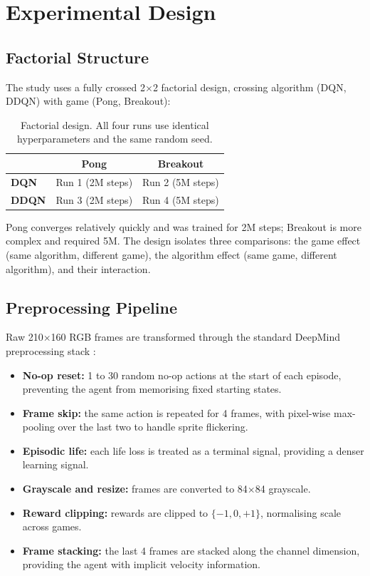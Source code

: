 \documentclass[a4paper]{article}
\begin{document}
\section{Experimental Design}
\label{sec:method}

\subsection{Factorial Structure}

The study uses a fully crossed 2$\times$2 factorial design, crossing algorithm (DQN, DDQN) with game (Pong, Breakout):

\begin{table}[H]
\centering
\caption{Factorial design. All four runs use identical hyperparameters and the same random seed.}
\label{tab:factorial}
\begin{tabular}{lcc}
\toprule
 & \textbf{Pong} & \textbf{Breakout} \\
\midrule
\textbf{DQN}  & Run 1 (2M steps) & Run 2 (5M steps) \\
\textbf{DDQN} & Run 3 (2M steps) & Run 4 (5M steps) \\
\bottomrule
\end{tabular}
\end{table}

Pong converges relatively quickly and was trained for 2M steps; Breakout is more complex and required 5M. The design isolates three comparisons: the game effect (same algorithm, different game), the algorithm effect (same game, different algorithm), and their interaction.

\subsection{Preprocessing Pipeline}

Raw 210$\times$160 RGB frames are transformed through the standard DeepMind preprocessing stack \cite{mnih2015human}:
\begin{itemize}
    \item \textbf{No-op reset:} 1 to 30 random no-op actions at the start of each episode, preventing the agent from memorising fixed starting states.
    \item \textbf{Frame skip:} the same action is repeated for 4 frames, with pixel-wise max-pooling over the last two to handle sprite flickering.
    \item \textbf{Episodic life:} each life loss is treated as a terminal signal, providing a denser learning signal.
    \item \textbf{Grayscale and resize:} frames are converted to 84$\times$84 grayscale.
    \item \textbf{Reward clipping:} rewards are clipped to $\{-1, 0, +1\}$, normalising scale across games.
    \item \textbf{Frame stacking:} the last 4 frames are stacked along the channel dimension, providing the agent with implicit velocity information.
\end{itemize}
\end{document}
